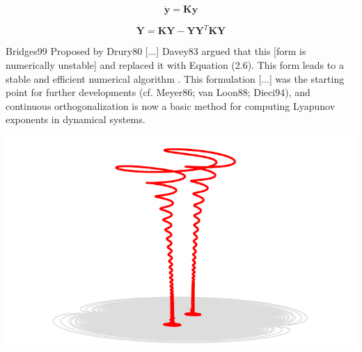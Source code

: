 \begin{equation*}
  \dot{\mathbf{y}} = \mathbf{K} \mathbf{y}
\end{equation*}

\begin{equation*}
  \dot{\mathbf{Y}} = \mathbf{K} \mathbf{Y} - \mathbf{Y} \mathbf{Y}^T \mathbf{K} \mathbf{Y}
\end{equation*}


\begin{block}{Bridges99}
Proposed by Drury80 [...] Davey83 argued that this [form is
numerically unstable] and replaced it with Equation (2.6). This form
leads to a stable and efficient numerical algorithm . This formulation
[...] was the starting point for further developments (cf. Meyer86;
van Loon88; Dieci94), and continuous orthogonalization is now a basic
method for computing Lyapunov exponents in dynamical systems.
\end{block}

\eframe

\begin{center}
  \includegraphics[width=\textwidth]{i/far.pdf}
\end{center}
\eframe

